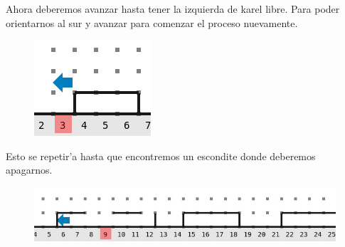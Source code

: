 \documentclass{article}
\begin{document}
    Ahora deberemos avanzar hasta tener la izquierda de karel libre. Para poder orientarnos al sur y avanzar para comenzar el proceso nuevamente.

    \begin{figure}[H]
        \centering
        \includegraphics[scale=0.5]{segunda_parte_saltar_barda}
    \end{figure}

    Esto se repetir'a hasta que encontremos un escondite donde deberemos apagarnos.

    \begin{figure}[H]
        \centering
        \includegraphics[scale=0.5]{escondite_bueno_2}
    \end{figure}
\end{document}
